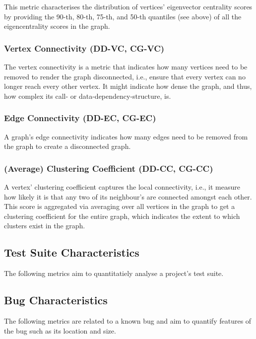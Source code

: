 \documentclass{scrartcl}
\begin{document}
This metric characterises the distribution of vertices' eigenvector centrality
scores by providing the 90-th, 80-th, 75-th, and 50-th quantiles (see above) of
all the eigencentrality scores in the graph.

\subsubsection{Vertex Connectivity (DD-VC, CG-VC)}

The vertex connectivity is a metric that indicates how many vertices need to be
removed to render the graph disconnected, i.e., ensure that every vertex can no
longer reach every other vertex. It might indicate how dense the graph, and
thus, how complex its call- or data-dependency-structure, is.

\subsubsection{Edge Connectivity (DD-EC, CG-EC)}

A graph's edge connectivity indicates how many edges need to be removed from the
graph to create a disconnected graph.

\subsubsection{(Average) Clustering Coefficient (DD-CC, CG-CC)}

A vertex' clustering coefficient captures the local connectivity, i.e., it
measure how likely it is that any two of its neighbour's are connected amongst
each other. This score is aggregated via averaging over all vertices in the
graph to get a clustering coefficient for the entire graph, which indicates the
extent to which clusters exist in the graph.

\subsection{Test Suite Characteristics}

The following metrics aim to quantitatiely analyse a project's test suite.

\subsection{Bug Characteristics}

The following metrics are related to a known bug and aim to quantify features of
the bug such as its location and size.
\end{document}
